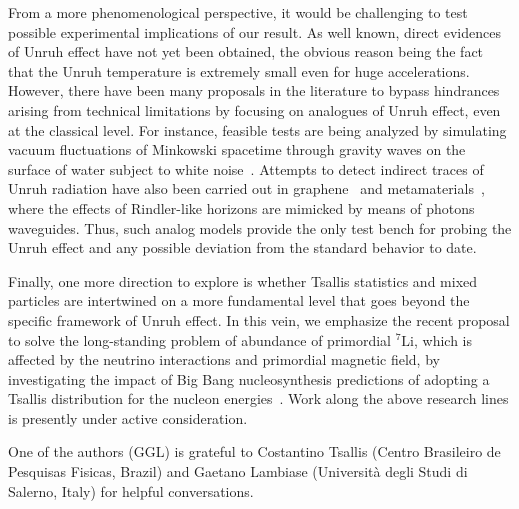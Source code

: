 \documentclass[floats,prd,aps,amssymb,nofootinbib,showkeys]{revtex4}
\begin{document}
From a more phenomenological perspective, 
it would be challenging to test possible experimental
implications of our result. As well known, direct evidences
of Unruh effect have not yet been obtained, the obvious reason
being the fact that the Unruh temperature is extremely small
even for huge accelerations. 
However, there have been many proposals
in the literature to bypass hindrances
arising from technical limitations
by focusing on analogues of Unruh effect, 
even at the classical level. For instance, 
feasible tests are being analyzed by simulating
vacuum fluctuations of Minkowski spacetime 
through gravity waves on
the surface of water subject to white noise~\cite{Leona}.
Attempts to detect indirect traces of Unruh radiation have also been
carried out in graphene~\cite{graphene} and
metamaterials~\cite{Smoly}, where the effects of 
Rindler-like horizons are mimicked by
means of photons waveguides. Thus, such analog models 
provide the only test bench for probing the Unruh effect and
any possible deviation from the standard behavior to date.

Finally, one more direction to explore is 
whether Tsallis statistics and mixed particles 
are intertwined on a more fundamental level that 
goes beyond the specific framework of Unruh effect. 
In this vein, we emphasize the recent proposal 
to solve the long-standing problem of abundance of primordial ${}^{7}\mathrm{Li}$, 
which is affected by the neutrino interactions and primordial magnetic field, by investigating the impact of Big Bang nucleosynthesis predictions of adopting a Tsallis distribution for the nucleon energies~\cite{Litium}. 
Work along the above research lines
is presently under active consideration. 


\acknowledgements 

One of the authors (GGL) is grateful to Costantino
Tsallis (Centro Brasileiro de Pesquisas Fisicas, Brazil) and Gaetano Lambiase (Universit\`a degli Studi di Salerno, Italy) for helpful conversations. 


\appendix
\end{document}
